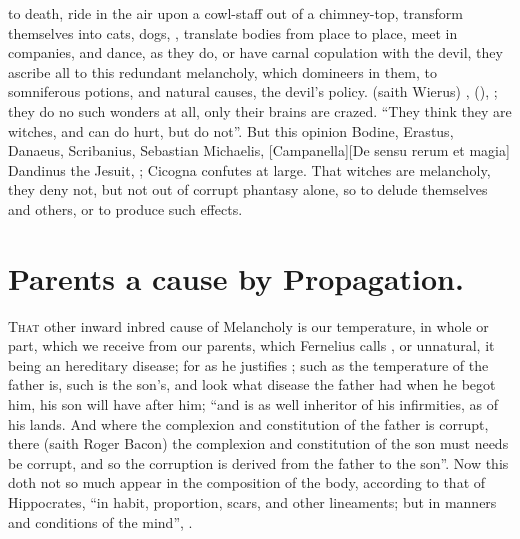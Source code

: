 to death, ride in the air upon a cowl-staff out of a chimney-top, transform
themselves into cats, dogs, \etc{}, translate bodies from place to place, meet
in companies, and dance, as they do, or have carnal copulation with the devil,
they ascribe all to this redundant melancholy, which domineers in them, to
somniferous potions, and natural causes, the devil's
policy.  (saith Wierus) ,
(), ; they do no such wonders at all, only their
brains are crazed. \enquote{They think they
are witches, and can do hurt, but do not}. But this opinion Bodine, Erastus,
Danaeus, Scribanius, Sebastian Michaelis, [Campanella][\textlatin{De sensu rerum et magia}]  Dandinus the Jesuit,
; Cicogna
confutes at large. That witches are melancholy, they deny not, but not out of
corrupt phantasy alone, so to delude themselves and others, or to produce such
effects.

\section{Parents a cause by Propagation.}

\lettrine{T}{hat} other inward inbred cause of Melancholy is our temperature,
in whole or part, which we receive from our parents, which
Fernelius calls , or unnatural, it
being an hereditary disease; for as he justifies ; such as the temperature of the father is, such is the son's, and
look what disease the father had when he begot him, his son will have after
him; \enquote{and is as well inheritor of his infirmities, as of
his lands. And where the complexion and constitution of the father is corrupt,
there (saith Roger Bacon) the complexion and constitution
of the son must needs be corrupt, and so the corruption is derived from the
father to the son}. Now this doth not so much appear in the composition of the
body, according to that of Hippocrates, \enquote{in habit,
proportion, scars, and other lineaments; but in manners and conditions of the
mind}, .

